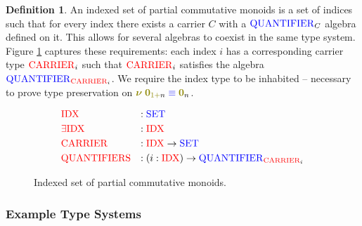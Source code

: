 \documentclass[a4paper,UKenglish,cleveref, autoref, thm-restate,authorcolumns]{lipics-v2019}
\theoremstyle{definition}
\newtheorem{nidefinition}[theorem]{Definition}
\newcommand{\type}[1]{\textcolor{blue}{\mathtt{\operatorname{#1}}}}
\newcommand{\constr}[1]{\textcolor{olive}{\mathtt{\operatorname{#1}}}}
\newcommand{\field}[1]{\textcolor{red}{\mathtt{\operatorname{#1}}}}
\newcommand{\PO}{\constr{\mathbf{0}}}
\newcommand{\new}{\constr{\boldsymbol{\nu}} \;}
\newcommand{\suc}{\constr{\scriptstyle 1+}}
\newcommand{\Set}{\type{SET}}
\newcommand{\Quantifier}{\type{QUANTIFIER}}
\newcommand{\eqeq}{\; \type{\equiv} \;}
\begin{document}
\begin{nidefinition}
  An indexed set of partial commutative monoids is a set of indices such that for every index there exists a carrier $C$ with a $\Quantifier_C$ algebra defined on it.
  This allows for several algebras to coexist in the same type system.
  Figure \ref{fig:indexed-multiplicities} captures these requirements: each index $i$ has a corresponding carrier type $\field{CARRIER}_i$ such that $\field{CARRIER}_i$ satisfies the algebra $\Quantifier_{\field{CARRIER}_i}$.
  We require the index type to be inhabited -- necessary to prove type preservation on $\new \PO_{\suc n} \eqeq \PO_n$.
  
  \begin{figure}[h]
  \begin{equation}
  \begin{split}
    &\field{IDX}          &:{} &\Set \\
    &\field{\exists IDX}  &:{} &\field{IDX} \\
    &\field{CARRIER}      &:{} &\field{IDX} \to \Set \\
    &\field{QUANTIFIERS}  &:{} &(i : \field{IDX}) \to \Quantifier_{\field{CARRIER}_i}
  \end{split}
  \end{equation}
  \caption{Indexed set of partial commutative monoids.}
  \label{fig:indexed-multiplicities}
  \end{figure}
\end{nidefinition}

\subsubsection{Example Type Systems}

\end{document}
